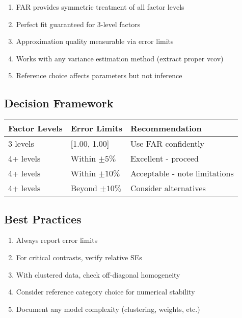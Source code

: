 \documentclass[11pt]{article}
\begin{document}
\begin{enumerate}
    \item FAR provides symmetric treatment of all factor levels
    \item Perfect fit guaranteed for 3-level factors
    \item Approximation quality measurable via error limits
    \item Works with any variance estimation method (extract proper vcov)
    \item Reference choice affects parameters but not inference
\end{enumerate}

\subsection{Decision Framework}

\begin{center}
\begin{tabular}{@{}lll@{}}
\toprule
Factor Levels & Error Limits & Recommendation \\
\midrule
3 levels & [1.00, 1.00] & Use FAR confidently \\
4+ levels & Within $\pm 5\%$ & Excellent - proceed \\
4+ levels & Within $\pm 10\%$ & Acceptable - note limitations \\
4+ levels & Beyond $\pm 10\%$ & Consider alternatives \\
\bottomrule
\end{tabular}
\end{center}

\subsection{Best Practices}

\begin{enumerate}
    \item Always report error limits
    \item For critical contrasts, verify relative SEs
    \item With clustered data, check off-diagonal homogeneity
    \item Consider reference category choice for numerical stability
    \item Document any model complexity (clustering, weights, etc.)
\end{enumerate}
\end{document}
